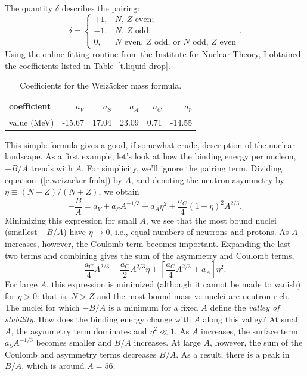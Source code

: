  The quantity $\delta$ describes the pairing:
\[
\delta = \left\{\begin{array}{lr}+1,& \textrm{$N$, $Z$ even;} \\-1,& \textrm{$N$, $Z$ odd;} \\ 0,& \textrm{$N$ even, $Z$ odd, or $N$ odd, $Z$ even}\end{array}\right. .
\]
Using the online fitting routine from the \href{http://128.95.95.61/~intuser/ld.html}{Institute for Nuclear Theory}, I obtained the coefficients listed in Table~\ref{t.liquid-drop}.

\begin{table}[htbp]
\label{t.liquid-drop}
\caption{Coefficients for the Weiz\"acker mass formula.\label{t.liquid-drop-coefficients}}
\begin{center}
\begin{tabular}{l|rrrrr}
\hline
coefficient & $a_{V}$ & $a_{S}$ & $a_{A}$ & $a_{C}$ & $a_{p}$ \\
\hline\hline
value (MeV) & -15.67 & 17.04 & 23.09 & 0.71 & -14.55\\
\hline
\end{tabular}
\end{center}
\end{table}

This simple formula gives a good, if somewhat crude, description of the nuclear landscape.  As a first example,  let's look at how the binding energy per nucleon, $-B/A$ trends with $A$.  For simplicity, we'll ignore the pairing term. Dividing equation~(\ref{e.weizacker-fmla}) by $A$, and denoting the neutron asymmetry by $\eta \equiv (N-Z)/(N+Z)$, we obtain
\begin{equation}\label{e.binding-energy-per-nucleon}
 -\frac{B}{A} = a_{V} + a_{S} A^{-1/3} + a_{A}\eta^{2} + \frac{a_{C}}{4} \left( 1-\eta\right)^{2} A^{2/3}.
\end{equation}
Minimizing this expression for small $A$, we see that the most bound nuclei (smallest $-B/A$) have $\eta \to 0$, i.e., equal numbers of neutrons and protons.  As $A$ increases, however, the Coulomb term becomes important.  Expanding the last two terms and combining gives the sum of the asymmetry and Coulomb terms,
\[ \frac{a_{C}}{4} A^{2/3} - \frac{a_{C}}{2}A^{2/3}\eta + \left[ \frac{a_{C}}{4}A^{2/3} + a_{A} \right] \eta^{2} .\]
For large $A$, this expression is minimized (although it cannot be made to vanish) for $\eta > 0$: that is, $N>Z$ and the most bound massive nuclei are neutron-rich. The nuclei for which $-B/A$ is a minimum for a fixed $A$ define the \emph{valley of stability}. How does the binding energy change with $A$ along this valley?  At small $A$, the asymmetry term dominates and $\eta^{2}\ll 1$.  As $A$ increases, the surface term $a_{S}A^{-1/3}$ becomes smaller and $B/A$ increases.  At large $A$, however, the sum of the Coulomb and asymmetry terms decreases $B/A$.  As a result, there is a peak in $B/A$, which is around $A = 56$.

